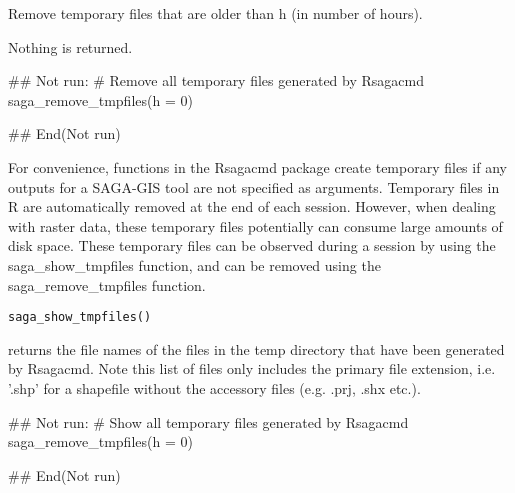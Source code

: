 \documentclass[a4paper]{book}
\begin{document}
%
\begin{Arguments}
\begin{ldescription}
\item[\code{h}] Remove temporary files that are older than h (in number of hours).
\end{ldescription}
\end{Arguments}
%
\begin{Value}
Nothing is returned.
\end{Value}
%
\begin{Examples}
\begin{ExampleCode}
## Not run: 
# Remove all temporary files generated by Rsagacmd
saga_remove_tmpfiles(h = 0)

## End(Not run)
\end{ExampleCode}
\end{Examples}
%
\begin{Description}
For convenience, functions in the Rsagacmd package create temporary files if
any outputs for a SAGA-GIS tool are not specified as arguments. Temporary
files in R are automatically removed at the end of each session. However,
when dealing with raster data, these temporary files potentially can consume
large amounts of disk space. These temporary files can be observed during a
session by using the saga\_show\_tmpfiles function, and can be removed using
the saga\_remove\_tmpfiles function.
\end{Description}
%
\begin{Usage}
\begin{verbatim}
saga_show_tmpfiles()
\end{verbatim}
\end{Usage}
%
\begin{Value}
returns the file names of the files in the temp directory that have
been generated by Rsagacmd. Note this list of files only includes the
primary file extension, i.e. '.shp' for a shapefile without the accessory
files (e.g. .prj, .shx etc.).
\end{Value}
%
\begin{Examples}
\begin{ExampleCode}
## Not run: 
# Show all temporary files generated by Rsagacmd
saga_remove_tmpfiles(h = 0)

## End(Not run)
\end{ExampleCode}
\end{Examples}
\end{document}
